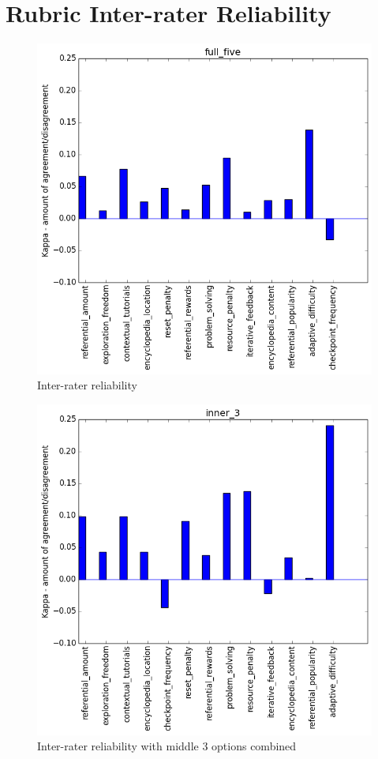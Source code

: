 		\section{Rubric Inter-rater Reliability}
			\begin{figure}[] 
				\centering 
				\includegraphics[width=\textwidth]{full_five_stats.png} 
				\caption{Inter-rater reliability}
			\end{figure}
			\begin{figure}[] 
				\centering 
				\includegraphics[width=\textwidth]{inner_3_stats.png} 
				\caption{Inter-rater reliability with middle 3 options combined}
			\end{figure}
